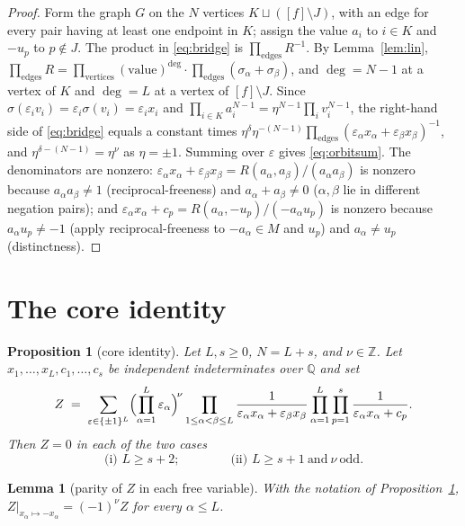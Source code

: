 \documentclass[11pt]{article}
\newtheorem{proposition}[theorem]{Proposition}
\newtheorem{lemma}[theorem]{Lemma}
\theoremstyle{definition}
\theoremstyle{remark}
\newcommand{\QQ}{\mathbb{Q}}
\newcommand{\ZZ}{\mathbb{Z}}
\begin{document}
\begin{proof}
Form the graph $G$ on the $N$ vertices $K\sqcup([f]\setminus J)$, with an edge for every
pair having at least one endpoint in $K$; assign the value $a_i$ to $i\in K$ and $-u_p$
to $p\notin J$. The product in \eqref{eq:bridge} is $\prod_{\text{edges}}R^{-1}$. By
Lemma~\ref{lem:lin},
$\prod_{\text{edges}}R=\prod_{\text{vertices}}(\text{value})^{\deg}\cdot
 \prod_{\text{edges}}(\sigma_\alpha+\sigma_\beta)$,
and $\deg=N-1$ at a vertex of $K$ and $\deg=L$ at a vertex of $[f]\setminus J$. Since
$\sigma(\varepsilon_iv_i)=\varepsilon_i\sigma(v_i)=\varepsilon_ix_i$ and
$\prod_{i\in K}a_i^{N-1}=\eta^{N-1}\prod_i v_i^{N-1}$, the right-hand side of
\eqref{eq:bridge} equals a constant times
$\eta^{\delta}\eta^{-(N-1)}\prod_{\text{edges}}(\varepsilon_\alpha x_\alpha
+\varepsilon_\beta x_\beta)^{-1}$, and $\eta^{\delta-(N-1)}=\eta^{\nu}$ as $\eta=\pm1$.
Summing over $\varepsilon$ gives \eqref{eq:orbitsum}. The denominators are nonzero:
$\varepsilon_\alpha x_\alpha+\varepsilon_\beta x_\beta=R(a_\alpha,a_\beta)/(a_\alpha
a_\beta)$ is nonzero because $a_\alpha a_{\beta}\neq1$ (reciprocal-freeness) and
$a_\alpha+a_\beta\neq0$ ($\alpha,\beta$ lie in different negation pairs); and
$\varepsilon_\alpha x_\alpha+c_p=R(a_\alpha,-u_p)/(-a_\alpha u_p)$ is nonzero because
$a_\alpha u_p\neq-1$ (apply reciprocal-freeness to $-a_\alpha\in M$ and $u_p$) and
$a_\alpha\neq u_p$ (distinctness).
\end{proof}

\section{The core identity}

\begin{proposition}[core identity]\label{prop:core}
Let $L,s\ge0$, $N=L+s$, and $\nu\in\ZZ$. Let $x_1,\dots,x_L,c_1,\dots,c_s$ be
independent indeterminates over $\QQ$ and set
\[
  Z \;=\; \sum_{\varepsilon\in\{\pm1\}^{L}}
     \Bigl(\prod_{\alpha=1}^{L}\varepsilon_\alpha\Bigr)^{\!\nu}
     \prod_{1\le\alpha<\beta\le L}\frac{1}{\varepsilon_\alpha x_\alpha+\varepsilon_\beta x_\beta}
     \prod_{\alpha=1}^{L}\prod_{p=1}^{s}\frac{1}{\varepsilon_\alpha x_\alpha+c_p}.
\]
Then $Z=0$ in each of the two cases
\[
  \text{(i) } L\ge s+2;\qquad\qquad \text{(ii) } L\ge s+1\ \text{and}\ \nu\ \text{odd}.
\]
\end{proposition}

\begin{lemma}[parity of $Z$ in each free variable]\label{lem:Zodd}
With the notation of Proposition~\ref{prop:core},
$Z|_{x_\alpha\mapsto-x_\alpha}=(-1)^{\nu}Z$ for every $\alpha\le L$.
\end{lemma}
\end{document}
